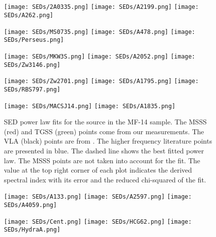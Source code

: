 \documentclass{aa}  %
\begin{document}



\begin{appendices}

\section{}
 \label{appendix:sed}

\begin{figure*}[t]
\begin{center}
\texttt{[image: SEDs/2A0335.png]}
\texttt{[image: SEDs/A2199.png]}
\texttt{[image: SEDs/A262.png]}

\texttt{[image: SEDs/MS0735.png]}
\texttt{[image: SEDs/A478.png]}
\texttt{[image: SEDs/Perseus.png]}

\texttt{[image: SEDs/MKW3S.png]}
\texttt{[image: SEDs/A2052.png]}
\texttt{[image: SEDs/Zw3146.png]}

\texttt{[image: SEDs/Zw2701.png]}
\texttt{[image: SEDs/A1795.png]}
\texttt{[image: SEDs/RBS797.png]}

\texttt{[image: SEDs/MACSJ14.png]}
\texttt{[image: SEDs/A1835.png]}

\end{center}
\caption{\small SED power law fits for the source in the MF-14 sample. The MSSS (red) and TGSS (green) points come from our measurements. The VLA (black) points are from \cite{Birzan2008}. The higher frequency literature points are presented in blue. The dashed line shows the best fitted power law. The MSSS points are not taken into account for the fit. The value at the top right corner of each plot indicates the derived spectral index with its error and the reduced chi-squared of the fit.
\label{fig:sed_msss_tgss_vlss}}
\vspace{0.15in}
\end{figure*}


\newpage

\begin{figure*}[t]
\begin{center}
\texttt{[image: SEDs/A133.png]}
\texttt{[image: SEDs/A2597.png]}
\texttt{[image: SEDs/A4059.png]}

\texttt{[image: SEDs/Cent.png]}
\texttt{[image: SEDs/HCG62.png]}
\texttt{[image: SEDs/HydraA.png]}


\end{center}
\end{figure*}
\end{appendices}
\end{document}
